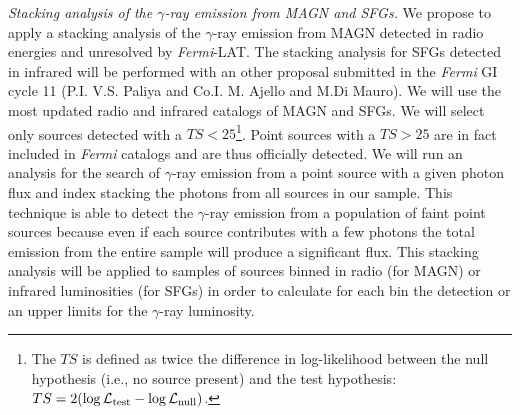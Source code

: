 \documentclass[12 pt]{article}
\begin{document}






{\it Stacking analysis of the $\gamma$-ray emission from MAGN and SFGs.} 
We propose to apply a stacking analysis of the $\gamma$-ray emission from MAGN detected in radio energies and unresolved by {\it Fermi}-LAT. The stacking analysis for SFGs detected in infrared will be performed with an other proposal submitted in the {\it Fermi} GI cycle 11 (P.I. V.S. Paliya and Co.I. M. Ajello and M.Di Mauro).
We will use the most updated radio and infrared catalogs of MAGN and SFGs. 
We will select only sources detected with a $TS<25$\footnote{The $TS$ is defined as twice the difference in log-likelihood between the null hypothesis (i.e., no source present) and the test hypothesis: $TS = 2 ( \log\mathcal{L}_{\rm test} - \log\mathcal{L}_{\rm null} )$.}. Point sources with a $TS>25$ are in fact included in {\it Fermi} catalogs and are thus officially detected.
We will run an analysis for the search of $\gamma$-ray emission from a point source with a given photon flux and index stacking the photons from all sources in our sample. 
This technique is able to detect the $\gamma$-ray emission from a population of faint point sources because even if each source contributes with a few photons the total emission from the entire sample will produce a significant flux.
This stacking analysis will be applied to samples of sources binned in radio (for MAGN) or infrared luminosities (for SFGs) in order to calculate for each bin the detection or an upper limits for the $\gamma$-ray luminosity. 
\end{document}

